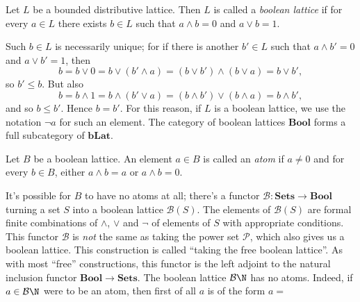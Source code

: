 \begin{definition}
Let $L$ be a bounded distributive lattice. Then $L$ is called a \emph{boolean lattice} if for every $a \in L$ there exists $b \in L$ such that $a \wedge b = 0$ and $a \vee b = 1$.
\end{definition}
Such $b \in L$ is necessarily unique; for if there is another $b' \in L$ such that $a \wedge b' = 0$ and $a \vee b' = 1$, then
\[ b = b \vee 0 = b \vee (b' \wedge a) = (b \vee b') \wedge (b \vee a) = b \vee b', \]
so $b' \leq b$. But also
\[ b = b \wedge 1 = b \wedge (b' \vee a) = (b \wedge b') \vee (b \wedge a) = b \wedge b', \]
and so $b \leq b'$. Hence $b = b'$. For this reason, if $L$ is a boolean lattice, we use the notation $\neg a$ for such an element. The category of boolean lattices $\mathbf{Bool}$ forms a full subcategory of $\mathbf{bLat}$.

\begin{definition}
Let $B$ be a boolean lattice. An element $a \in B$ is called an \emph{atom} if $a \neq 0$ and for every $b \in B$, either $a \wedge b = a$ or $a \wedge b = 0$.
\end{definition}

It's possible for $B$ to have no atoms at all; there's a functor $\mathcal{B} : \mathbf{Sets} \to \mathbf{Bool}$ turning a set $S$ into a boolean lattice $\mathcal{B}(S)$. The elements of $\mathcal{B}(S)$ are formal finite combinations of $\wedge$, $\vee$ and $\neg$ of elements of $S$ with appropriate conditions. This functor $\mathcal{B}$ is \emph{not} the same as taking the power set $\mathcal{P}$, which also gives us a boolean lattice. This construction is called ``taking the free boolean lattice''. As with most ``free'' constructions, this functor is the left adjoint to the natural inclusion functor $\mathbf{Bool} \to \mathbf{Sets}$. The boolean lattice $\mathcal{B} \N$ has no atoms. Indeed, if $a \in \mathcal{B} \N$ were to be an atom, then first of all $a$ is of the form $a = $

